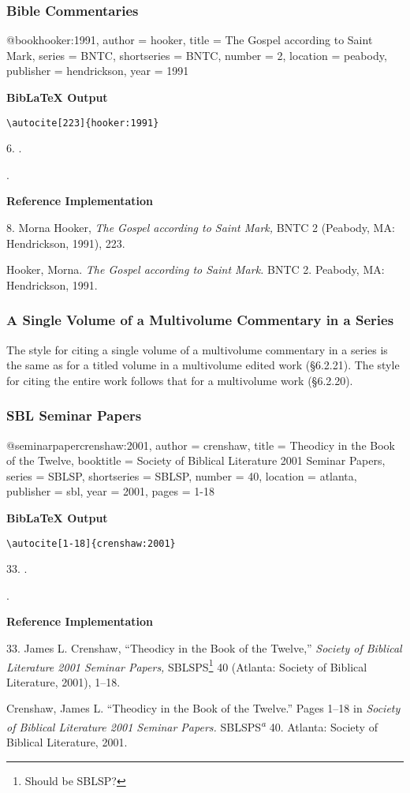 \documentclass[a4paper]{article}
\newcommand\citetestns[3]{%
  {\textbf{BibLaTeX Output}\par
   \nobreak
   \texttt{\textbackslash autocite[#2]\{#3\}}\par
   \color{biblatex-colour}
   #1. \cite[#2]{#3}.\par
   \hangindent\bibindent\bibentrycite{#3}.\par}}
\newenvironment{refimp}{%
  \begin{minipage}{\linewidth}
    \setlength{\parskip}{1ex}
    \textbf{Reference Implementation}\par
    \nobreak
    \color{reference-colour}
}{\end{minipage}}
\newenvironment{vb}{%
  \setlength{\parskip}{0pt}
  \verbatim}{\endverbatim}
\begin{document}
\subsubsection{Bible Commentaries}

\begin{vb}
@book{hooker:1991,
  author = hooker,
  title = {The Gospel according to Saint Mark},
  series = BNTC,
  shortseries = {BNTC},
  number = {2},
  location = peabody,
  publisher = hendrickson,
  year = {1991}
}
\end{vb}  

\citetestns{6}{223}{hooker:1991}

\begin{refimp}
  8. Morna Hooker, \emph{The Gospel according to Saint Mark,} BNTC 2 (Peabody,
  MA: Hendrickson, 1991), 223.

  \hangindent\bibindent Hooker, Morna. \emph{The Gospel according to Saint
  Mark.} BNTC 2. Peabody, MA: Hendrickson, 1991.
\end{refimp}

\subsubsection{A Single Volume of a Multivolume Commentary in a Series}

The style for citing a single volume of a multivolume commentary in a series
is the same as for a titled volume in a multivolume edited work (§6.2.21). The
style for citing the entire work follows that for a multivolume work
(§6.2.20).

\subsubsection{SBL Seminar Papers}

\begin{vb}
@seminarpaper{crenshaw:2001,
  author = crenshaw,
  title = {Theodicy in the Book of the Twelve},
  booktitle = {Society of Biblical Literature 2001 Seminar Papers},
  series = SBLSP,
  shortseries = {SBLSP},
  number = {40},
  location = atlanta,
  publisher = sbl,
  year = {2001},
  pages = {1-18}
}
\end{vb}

\citetestns{33}{1-18}{crenshaw:2001}

\begin{refimp}
  33. James L. Crenshaw, “Theodicy in the Book of the Twelve,” \emph{Society
  of Biblical Literature 2001 Seminar Papers,} SBLSPS\footnote{Should be
  SBLSP?} 40 (Atlanta: Society of Biblical Literature, 2001), 1–18.
  
  \hangindent\bibindent Crenshaw, James L. “Theodicy in the Book of the
  Twelve.” Pages 1–18 in \emph{Society of Biblical Literature 2001 Seminar
  Papers.} SBLSPS\textsuperscript{\emph{a}} 40. Atlanta: Society of Biblical
  Literature, 2001.
\end{refimp}
\end{document}
